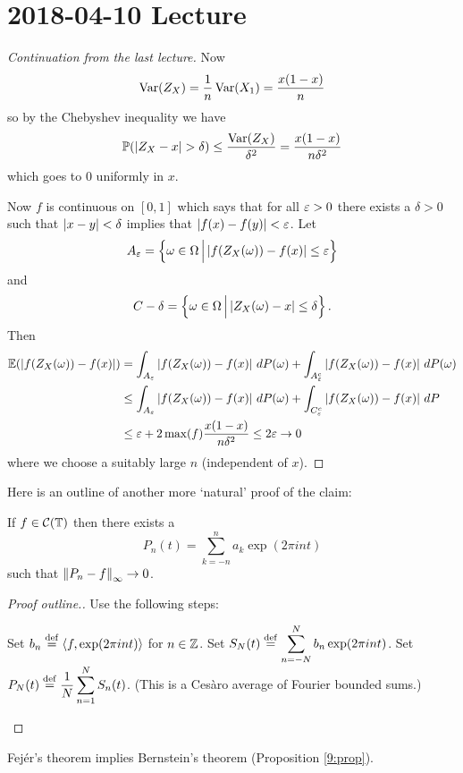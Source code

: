 \section{2018-04-10 Lecture}

\begin{proof}[Continuation from the last lecture]
	Now
	\[\operatorname{Var}(Z_X) = \frac 1n \operatorname{Var}(X_1) = \frac{x(1-x)}n\]
	so by the Chebyshev inequality we have
	\[\mathbb{P}(\left\lvert Z_X-x \right\rvert>\delta) \leq \frac{\operatorname{Var}(Z_X)}{\delta^2} = \frac{x(1-x)}{n\delta^2}\]
	which goes to $0$ uniformly in $x$.
	
	Now $f$ is continuous on $[0,1]$ which says that for all $\varepsilon>0$ there exists a $\delta>0$ such that $\left\lvert x-y \right\rvert<\delta$ implies that $\left\lvert f(x)-f(y) \right\rvert<\varepsilon$.
	Let
	\[A_\varepsilon = \left\{\omega \in \Omega \, \Big| \left\lvert f(Z_X(\omega))-f(x) \right\rvert\leq\varepsilon\right\}\]
	and
	\[C-\delta = \left\{\omega \in \Omega \, \Big| \left\lvert Z_X(\omega)-x \right\rvert\leq\delta\right\}.\]
	Then
	\begin{align*}
		\mathbb{E}(\left\lvert f(Z_X(\omega))-f(x) \right\rvert) &= \int_{A_\varepsilon} \left\lvert f(Z_X(\omega))-f(x) \right\rvert \, dP(\omega) + \int_{A_\varepsilon^c} \left\lvert f(Z_X(\omega))-f(x) \right\rvert \, dP(\omega) \\
		&\leq \int_{A_\varepsilon} \left\lvert f(Z_X(\omega))-f(x) \right\rvert \, dP(\omega) + \int_{C_\varepsilon^c} \left\lvert f(Z_X(\omega))-f(x) \right\rvert \, dP \\
		&\leq \varepsilon + 2 \max(f)\frac{x(1-x)}{n\delta^2} \leq 2\varepsilon \to 0
	\end{align*}
	where we choose a suitably large $n$ (independent of $x$).
\end{proof}

Here is an outline of another more `natural' proof of the claim:

\begin{thm}
	If $f \in \mathcal{C}(\mathbb{T})$ then there exists a
	\[P_n(t)=\sum_{k=-n}^n a_k \exp(2\pi int)\]
	such that $\left\lVert P_n-f \right\rVert_\infty \to 0$.
\end{thm}

\begin{proof}[Proof outline.]
	Use the following steps:
	\begin{enum}
		\io Set $b_n \overset{\mathrm{def}}{=} {\left\langle f,\exp(2\pi int) \right\rangle}$ for $n \in \mathbb{Z}$.
		\io Set $\displaystyle S_N(t) \overset{\mathrm{def}}{=} \sum_{n=-N}^N b_n \exp(2\pi int)$.
		\io Set $\displaystyle P_N(t) \overset{\mathrm{def}}{=} \frac 1N \sum_{n=1}^N S_n(t)$. (This is a Ces\`aro average of Fourier bounded sums.)
	\end{enum}
\end{proof}

\begin{exer}
	Fej\'er's theorem implies Bernstein's theorem (Proposition \ref{9:prop}).
\end{exer}

